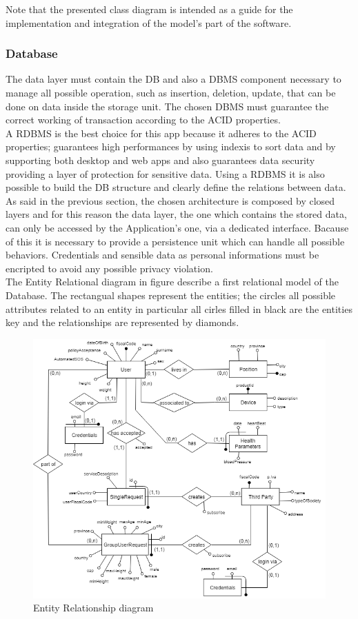 Note that the presented class diagram is intended as a guide for the implementation and integration of the model's part of the software.


\subsubsection{Database}
The data layer must contain the DB and also a DBMS component necessary to manage all possible operation, such as insertion, deletion, update, that can be done on data inside the storage unit. The chosen DBMS must guarantee the correct working of transaction according to the ACID properties.\\
A RDBMS is the best choice for this app because it adheres to the ACID properties; guarantees high performances by using indexis to sort data and by supporting both desktop and web apps and also guarantees data security providing a layer of protection for sensitive data. Using a RDBMS it is also possible to build  the DB structure and clearly define the relations between data.\\ 
As said in the previous section, the chosen architecture is composed by closed layers and for this reason  the data layer, the one which contains the stored data, can only be accessed by the Application's one, via a dedicated interface. Bacause of this it is necessary to provide a persistence unit which can handle all possible behaviors. Credentials and sensible data as personal informations must be encripted to avoid any possible privacy violation.\\
The Entity Relational diagram in figure describe a first relational model of the Database. The rectangual shapes represent the entities; the circles all possible attributes related to an entity in particular all cirles filled in black are the entities key and the relationships are represented by diamonds.

\begin{figure}[h!]
	\includegraphics[width=1.0\textwidth]{./pictures/ER_diagram.png}\par
	\caption{Entity Relationship diagram}
\end{figure}
\FloatBarrier

